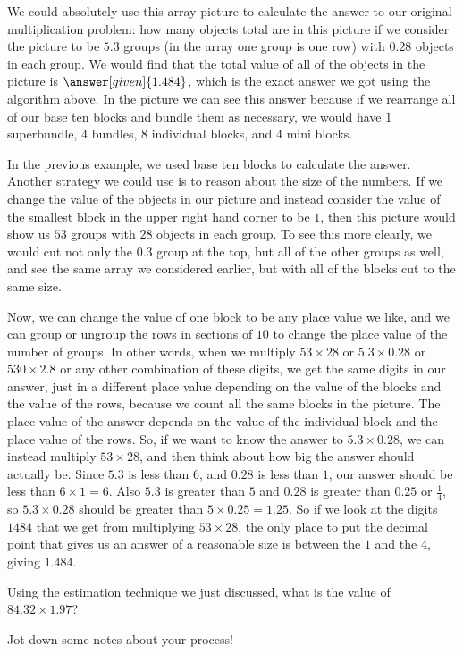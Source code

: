 \documentclass{ximera}
\begin{document}
\begin{explanation}
We could absolutely use this array picture to calculate the answer to our original multiplication problem: how many objects total are in this picture if we consider the picture to be $5.3$ groups (in the array one group is one row) with $0.28$ objects in each group. We would find that the total value of all of the objects in the picture is $\answer[given]{1.484}$, which is the exact answer we got using the algorithm above. In the picture we can see this answer because if we rearrange all of our base ten blocks and bundle them as necessary, we would have $1$ superbundle, $4$ bundles, $8$ individual blocks, and $4$ mini blocks.
\end{explanation}





In the previous example, we used base ten blocks to calculate the answer. Another strategy we could use is to reason about the size of the numbers. If we change the value of the objects in our picture and instead consider the value of the smallest block in the upper right hand corner to be $1$, then this picture would show us $53$ groups with $28$ objects in each group. To see this more clearly, we would cut not only the $0.3$ group at the top, but all of the other groups as well, and see the same array we considered earlier, but with all of the blocks cut to the same size.

\begin{image}
\end{image}

Now, we can change the value of one block to be any place value we like, and we can group or ungroup the rows in sections of $10$ to change the place value of the number of groups. In other words, when we multiply $53 \times 28$ or $5.3 \times 0.28$ or $530 \times 2.8$ or any other combination of these digits, we get the same digits in our answer, just in a different place value depending on the value of the blocks and the value of the rows, because we count all the same blocks in the picture. The place value of the answer depends on the value of the individual block and the place value of the rows. So, if we want to know the answer to $5.3 \times 0.28$, we can instead multiply $53 \times 28$, and then think about how big the answer should actually be. Since $5.3$ is less than 6, and $0.28$ is less than $1$, our answer should be less than $6 \times 1 = 6$. Also $5.3$ is greater than $5$ and $0.28$ is greater than $0.25$ or $\frac{1}{4}$, so $5.3 \times 0.28$ should be greater than $5 \times 0.25 = 1.25$. So if we look at the digits $1484$ that we get from multiplying $53 \times 28$, the only place to put the decimal point that gives us an answer of a reasonable size is between the $1$ and the $4$, giving $1.484$.




\begin{question}
Using the estimation technique we just discussed, what is the value of $84.32 \times 1.97$?

\begin{freeResponse}
Jot down some notes about your process!
\end{freeResponse}
\end{question}
\end{document}
